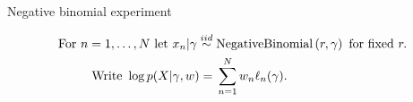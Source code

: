 







\begin{frame}{Negative binomial experiment}

    \begin{align*}
    \textrm{For }n={} 1,\ldots, N \textrm{ let }
        x_n |  \gamma \overset{iid}{\sim}{}& \textrm{NegativeBinomial}\left(r, \gamma \right)
        \textrm{ for fixed }r.\\
    \textrm{Write }\log p(X \vert \gamma, w) ={}&
           \sum_{n=1}^N w_n \ell_n(\gamma).
    \end{align*}
    \pause
    \LowDimAccuracyGraph{}
\end{frame}
        



